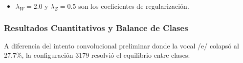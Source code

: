 \documentclass[11pt,a4paper]{article}
\begin{document}
\begin{itemize}
\begin{equation}
        \mathcal{L}_Z = \|\text{Cov}(Z) - I_2\|_F^2
    \end{equation}
    donde $\text{Cov}(Z) = \frac{1}{B-1} \sum_{b=1}^B (z_b - \bar{z})(z_b - \bar{z})^T \in \mathbb{R}^{2 \times 2}$ es la matriz de covarianza muestral del lote latente, $\bar{z} \in \mathbb{R}^2$ es el centroide medio, e $I_2$ es la matriz identidad bidimensional. Esta penalización obliga a que las dos coordenadas $z_1$ y $z_2$ posean varianza unitaria y covarianza cruzada nula, distribuyendo uniformemente la dispersión fonatoria.
    \item $\lambda_W = 2.0$ y $\lambda_Z = 0.5$ son los coeficientes de regularización.
\end{itemize}

\subsubsection{Resultados Cuantitativos y Balance de Clases}
\label{subsubsec:resultados_conv_ortogonal}

A diferencia del intento convolucional preliminar donde la vocal /e/ colapsó al 27.7\%, la configuración 3179 resolvió el equilibrio entre clases:
\end{document}
